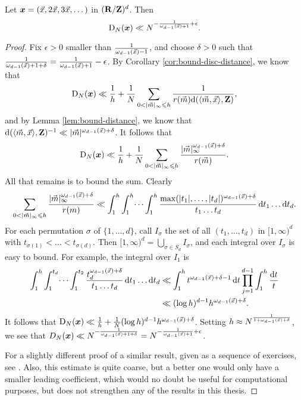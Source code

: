 \begin{theorem}\label{thm:disc-upper-bound}
Let ${\boldsymbol x}=(\vec{x},2\vec{x},3\vec{x},\dots)$ in $(\mathbf{R}/\mathbf{Z})^d$. Then 
\[
	\operatorname{D}_N({\boldsymbol x}) \ll N^{-\frac{1}{\omega_{d-1}(\vec{x})+1}+\epsilon} .
\]
\end{theorem}
\begin{proof}
Fix $\epsilon>0$ smaller than $\frac{1}{\omega_{d-1}(\vec{x}) - 1}$, and choose 
$\delta>0$ such that 
$\frac{1}{\omega_{d-1}(\vec{x})+1+\delta} = \frac{1}{\omega_{d-1}(\vec{x})+1} - \epsilon$. 
By Corollary \ref{cor:bound-disc-distance}, we know that 
\[
	\D_N(\bx) \ll \frac 1 h + \frac 1 N \sum_{0<|\vm|_\infty \leqslant h} \frac{1}{r(\vm) \dd(\langle \vm,\vx\rangle,\bZ)} ,
\]
and by Lemma \ref{lem:bound-distance}, we know that 
$\mathrm{d}(\langle \vec{m},\vec{x}\rangle,\mathbf{Z})^{-1} \ll |\vec{m}|^{\omega_{d-1}(\vec{x})+\delta}$. 
It follows that 
\[
	\operatorname{D}_N({\boldsymbol x}) \ll \frac 1 h + \frac 1 N \sum_{0 < |\vec{m}|_\infty \leqslant h} \frac{|\vec{m}|_\infty^{\omega_{d-1}(\vec{x})+\delta}}{r(\vec{m})} .
\]
All that remains is to bound the sum. Clearly 
\[
	\sum_{0 < |\vec{m}|_\infty \leqslant h} \frac{|\vec{m}|_\infty^{\omega_{d-1}(\vec{x}) + \delta}}{r(m)} \ll \int_1^h \int_1^h \dots \int_1^h \frac{\max(|t_1|,\dots,|t_d|)^{\omega_{d-1}(\vec{x})+\delta}}{t_1 \dots t_d}\, \mathrm{d} t_1 \dots \mathrm{d} t_d .
\]
For each permutation $\sigma$ of $\{1,\dots,d\}$, call $I_\sigma$ the set of 
all $(t_1,\dots,t_d)$ in $[1,\infty)^d$ with 
$t_{\sigma(1)} < \dots < t_{\sigma(d)}$. Then 
$[1,\infty)^d = \bigcup_{\sigma\in S_d} I_\sigma$, and each integral over 
$I_\sigma$ is easy to bound. For example, the integral over $I_1$ is 
\begin{align*}
	\int_1^h \int_1^{t_d} \dots \int_1^{t_2} \frac{t_d^{\omega_{d-1}(\vec{x})+\delta}}{t_1 \dots t_d}\, \mathrm{d} t_1 \dots \mathrm{d} t_d 
		&\ll \int_1^h t^{\omega_{d-1}(\vec{x})+\delta-1}\, \mathrm{d} t \prod_{j=1}^{d-1} \int_1^h \frac{\mathrm{d} t}{t} \\
		&\ll (\log h)^{d-1} h^{\omega_{d-1}(\vec{x})+\delta} .
\end{align*}
It follows that 
$\operatorname{D}_N({\boldsymbol x}) \ll \frac 1 h + \frac 1 N (\log h)^{d-1} h^{\omega_{d-1}(\vec{x})+\delta}$. 
Setting $h\approx N^{\frac{1}{1+\omega_{d-1}(\vec{x})+\delta}}$, we see that 
$D_N({\boldsymbol x}) \ll N^{-\frac{1}{\omega_{d-1}(\vec{x})+1+\delta}} = N^{-\frac{1}{\omega_{d-1}(\vec{x})+1} + \epsilon}$. 

For a slightly different proof of a similar result, given as a sequence of 
exercises, see  \cite[Ch.~2, Ex.~3.15, 16, 17]{kuipers-niederreiter-1974}. 
Also, this estimate is quite coarse, but a better one would only have a smaller 
leading coefficient, which would no doubt be useful for computational 
purposes, but does not strengthen any of the results in this thesis.  
\end{proof}

